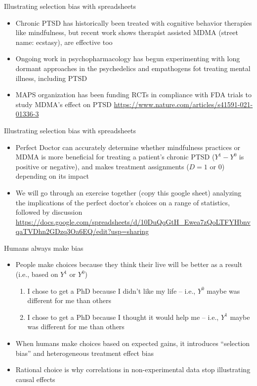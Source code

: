 \documentclass{beamer}
\begin{document}
\begin{frame}{Illustrating selection bias with spreadsheets}

  \begin{itemize}
    \item Chronic PTSD has historically been treated with cognitive behavior therapies like mindfulness, but recent work shows therapist assisted MDMA (street name: ecstasy), are effective too
    \item Ongoing work in psychopharmacology has begun experimenting with long dormant approaches in the psychedelics and empathogens fot treating mental illness, including PTSD
    \item MAPS organization has been funding RCTs in compliance with FDA trials to study MDMA's effect on PTSD \url{https://www.nature.com/articles/s41591-021-01336-3}
    \end{itemize}
    
\end{frame}


\begin{frame}{Illustrating selection bias with spreadsheets}
\begin{itemize}
\item Perfect Doctor can accurately determine whether mindfulness practices or MDMA is more beneficial for treating a patient's chronic PTSD ($Y^1 - Y^0$ is positive or negative), and makes treatment assignments ($D=1$ or $0$) depending on its impact
\item We will go through an exercise together (copy this google sheet) analyzing the implications of the perfect doctor's choices on a range of statistics, followed by discussion \url{https://docs.google.com/spreadsheets/d/10DuQqGtH_Ewea7zQoLTFYHbnvqaTVDhn2GDzq3Oa6EQ/edit?usp=sharing}
\end{itemize}
\end{frame}

\begin{frame}{Humans always make bias}

\begin{itemize}
\item People make choices because they think their live will be better as a result (i.e., based on $Y^1$ or $Y^0$)
	\begin{enumerate}
	\item I chose to get a PhD because I didn't like my life -- i.e., $Y^0$ maybe was different for me than others
	\item I chose to get a PhD because I thought it would help me -- i.e., $Y^1$ maybe was different for me than others
	\end{enumerate}
\item When humans make choices based on expected gains, it introduces ``selection bias'' and heterogeneous treatment effect bias 
\item Rational choice is why correlations in non-experimental data stop illustrating causal effects
\end{itemize}

\end{frame}
\end{document}
